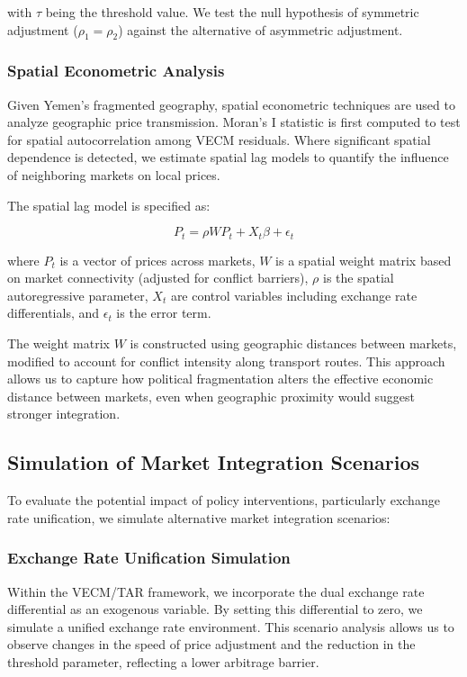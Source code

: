 with $\tau$ being the threshold value. We test the null hypothesis of symmetric adjustment ($\rho_1 = \rho_2$) against the alternative of asymmetric adjustment.

\subsubsection{Spatial Econometric Analysis}

Given Yemen's fragmented geography, spatial econometric techniques are used to analyze geographic price transmission. Moran's I statistic is first computed to test for spatial autocorrelation among VECM residuals. Where significant spatial dependence is detected, we estimate spatial lag models to quantify the influence of neighboring markets on local prices.\autocite{anselin1988}

The spatial lag model is specified as:

\begin{equation}
P_t = \rho W P_t + X_t \beta + \epsilon_t
\end{equation}

where $P_t$ is a vector of prices across markets, $W$ is a spatial weight matrix based on market connectivity (adjusted for conflict barriers), $\rho$ is the spatial autoregressive parameter, $X_t$ are control variables including exchange rate differentials, and $\epsilon_t$ is the error term.

The weight matrix $W$ is constructed using geographic distances between markets, modified to account for conflict intensity along transport routes. This approach allows us to capture how political fragmentation alters the effective economic distance between markets, even when geographic proximity would suggest stronger integration.

\subsection{Simulation of Market Integration Scenarios}

To evaluate the potential impact of policy interventions, particularly exchange rate unification, we simulate alternative market integration scenarios:

\subsubsection{Exchange Rate Unification Simulation}

Within the VECM/TAR framework, we incorporate the dual exchange rate differential as an exogenous variable. By setting this differential to zero, we simulate a unified exchange rate environment. This scenario analysis allows us to observe changes in the speed of price adjustment and the reduction in the threshold parameter, reflecting a lower arbitrage barrier.

